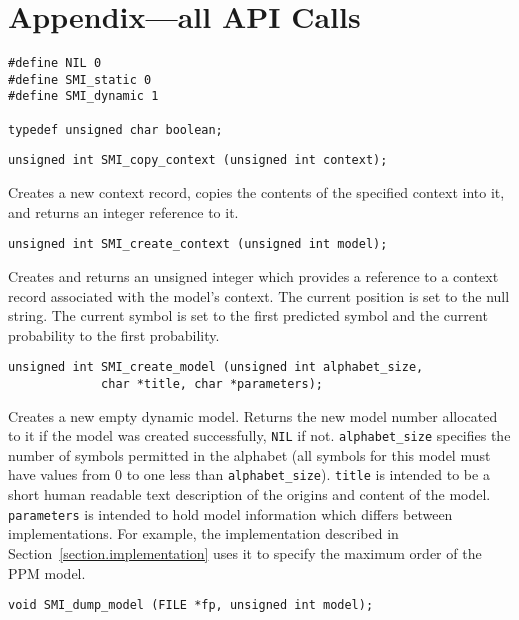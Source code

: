 \documentclass[11pt]{article}
\begin{document}
{\small
\section{Appendix---all API Calls}
\begin{verbatim}
#define NIL 0
#define SMI_static 0
#define SMI_dynamic 1

typedef unsigned char boolean;
\end{verbatim}

\begin{verbatim}
unsigned int SMI_copy_context (unsigned int context);
\end{verbatim}

\vspace{-0.2cm}
Creates a new context record, copies the contents of the specified context
into it, and returns an integer reference to it.

\begin{verbatim}
unsigned int SMI_create_context (unsigned int model);
\end{verbatim}

\vspace{-0.2cm}
Creates and returns an unsigned integer which provides a reference to a
context record associated with the model's context. The current position is
set to the null string. The current symbol is set to the first predicted
symbol and the current probability to the first probability.

\begin{verbatim}
unsigned int SMI_create_model (unsigned int alphabet_size,
             char *title, char *parameters);
\end{verbatim}

\vspace{-0.2cm}
Creates a new empty dynamic model. Returns the new model number allocated
to it if the model was created successfully, \verb|NIL| if not.
\verb|alphabet_size| specifies the number
of symbols permitted in the alphabet (all symbols for this model must have
values from 0 to one less than \verb|alphabet_size|). \verb|title| is
intended to be a short human readable text description of the origins and
content of the model. \verb|parameters| is intended to hold model
information which differs between implementations. For example, the
implementation described in Section~\ref{section.implementation} uses it to
specify the maximum order of the PPM model.

\begin{verbatim}
void SMI_dump_model (FILE *fp, unsigned int model);
\end{verbatim}

}
\end{document}
